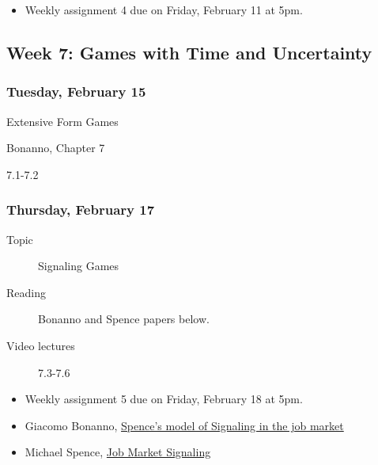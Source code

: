 \documentclass[
]{article}
\providecommand{\tightlist}{%
  \setlength{\itemsep}{0pt}\setlength{\parskip}{0pt}}
\begin{document}
\begin{itemize}
\tightlist
\item
  Weekly assignment 4 due on Friday, February 11 at 5pm.
\end{itemize}

\hypertarget{week-7-games-with-time-and-uncertainty}{%
\subsection{Week 7: Games with Time and
Uncertainty}\label{week-7-games-with-time-and-uncertainty}}

\begin{multicols}{2}

\hypertarget{tuesday-february-15}{%
\subsubsection{Tuesday, February 15}\label{tuesday-february-15}}

\begin{description}
\tightlist
\item[Topic]
Extensive Form Games
\item[Reading]
Bonanno, Chapter 7
\item[Video lectures]
7.1-7.2
\end{description}

\hypertarget{thursday-february-17}{%
\subsubsection{Thursday, February 17}\label{thursday-february-17}}

\begin{description}
\item[Topic]
Signaling Games
\item[Reading]
Bonanno and Spence papers below.
\item[Video lectures]
7.3-7.6
\end{description}

\end{multicols}

\begin{itemize}
\tightlist
\item
  Weekly assignment 5 due on Friday, February 18 at 5pm.
\item
  Giacomo Bonanno,
  \href{http://faculty.econ.ucdavis.edu/faculty/bonanno/teaching/200C/Signaling.pdf}{Spence's
  model of Signaling in the job market}
\item
  Michael Spence, \href{https://www.jstor.org/stable/1882010?seq=1}{Job
  Market Signaling}
\end{itemize}
\end{document}

